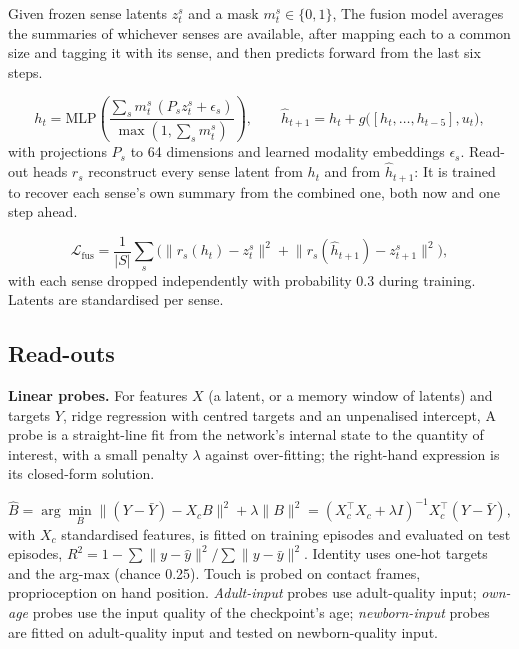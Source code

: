 \documentclass{article}
\begin{document}
Given frozen sense latents \(z^s_t\) and a mask \(m^s_t\in\{0,1\}\),
The fusion model averages the summaries of whichever senses are available, after mapping each to a common size and tagging it with its sense, and then predicts forward from the last six steps.

\begin{equation}h_t=\mathrm{MLP}\!\left(\frac{\sum_s m^s_t\,(P_s z^s_t+\epsilon_s)}{\max(1,\sum_s m^s_t)}\right),\qquad \hat h_{t+1}=h_t+g\big([h_t,\dots,h_{t-5}],u_t\big),\end{equation}
with projections \(P_s\) to 64 dimensions and learned modality embeddings \(\epsilon_s\). Read-out heads \(r_s\) reconstruct every sense latent from \(h_t\) and from \(\hat h_{t+1}\):
It is trained to recover each sense's own summary from the combined one, both now and one step ahead.

\begin{equation}\mathcal L_{\text{fus}}=\frac1{|S|}\sum_s\Big(\lVert r_s(h_t)-z^s_t\rVert^2+\lVert r_s(\hat h_{t+1})-z^s_{t+1}\rVert^2\Big),\end{equation}
with each sense dropped independently with probability 0.3 during training. Latents are standardised per sense.

\hypertarget{read-outs}{%
\subsection{Read-outs}\label{read-outs}}

\textbf{Linear probes.} For features \(X\) (a latent, or a memory window of latents) and targets \(Y\), ridge regression with centred targets and an unpenalised intercept,
A probe is a straight-line fit from the network's internal state to the quantity of interest, with a small penalty \(\lambda\) against over-fitting; the right-hand expression is its closed-form solution.

\begin{equation}\hat B=\arg\min_B\lVert (Y-\bar Y)-X_cB\rVert^2+\lambda\lVert B\rVert^2=(X_c^\top X_c+\lambda I)^{-1}X_c^\top(Y-\bar Y),\end{equation}
with \(X_c\) standardised features, is fitted on training episodes and evaluated on test episodes, \(R^2=1-\sum\lVert y-\hat y\rVert^2/\sum\lVert y-\bar y\rVert^2\). Identity uses one-hot targets and the arg-max (chance 0.25). Touch is probed on contact frames, proprioception on hand position. \emph{Adult-input} probes use adult-quality input; \emph{own-age} probes use the input quality of the checkpoint's age; \emph{newborn-input} probes are fitted on adult-quality input and tested on newborn-quality input.
\end{document}
